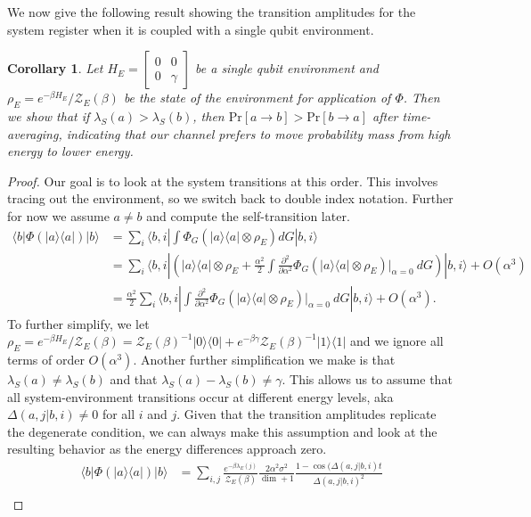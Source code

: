 \documentclass{article}
\newtheorem{corollary}[theorem]{Corollary}
\newcommand{\ket}[1]{|#1\rangle}
\newcommand{\bra}[1]{\langle #1|}
\newcommand{\ketbra}[2]{| #1\rangle\! \langle #2|}
\newcommand{\parens}[1]{\left( #1 \right)}
\newcommand{\prob}[1]{\text{Pr}\left[ #1 \right]}
\newcommand{\bigo}[1]{O\left( #1 \right)}
\newcommand{\partfun}{\mathcal{Z}}
\begin{document}
We now give the following result showing the transition amplitudes for the system register when it is coupled with a single qubit environment.
\begin{corollary}
    Let $H_E = \begin{bmatrix} 0 & 0 \\ 0 & \gamma \end{bmatrix}$ be a single qubit environment and $\rho_E = e^{-\beta H_E} / \partfun_E(\beta)$ be the state of the environment for application of $\Phi$. Then we show that if $\lambda_S(a) > \lambda_S(b)$, then $\prob{a \to b} > \prob{b \to a}$ after time-averaging, indicating that our channel prefers to move probability mass from high energy to lower energy. 
\end{corollary}
\begin{proof}
Our goal is to look at the system transitions at this order. This involves tracing out the environment, so we switch back to double index notation. Further for now we assume $a \neq b$ and compute the self-transition later.
\begin{align}
    \bra{b} \Phi(\ketbra{a}{a}) \ket{b} &= \sum_{i} \bra{b, i} \int \Phi_G(\ketbra{a}{a} \otimes \rho_E) dG \ket{b,i} \\
    &= \sum_i \bra{b,i} \parens{\ketbra{a}{a} \otimes \rho_E + \frac{\alpha^2}{2} \int \frac{\partial^2}{\partial \alpha^2} \Phi_G(\ketbra{a}{a} \otimes \rho_E) \bigg|_{\alpha =0} ~dG } \ket{b, i} + \bigo{\alpha^3} \\
    &= \frac{\alpha^2}{2} \sum_i \bra{b,i}  \int \frac{\partial^2}{\partial \alpha^2} \Phi_G(\ketbra{a}{a} \otimes \rho_E) \bigg|_{\alpha =0} ~dG  \ket{b, i} + \bigo{\alpha^3}.
\end{align}
To further simplify, we let $\rho_E = e^{-\beta H_E} / \partfun_E(\beta) = \partfun_E(\beta)^{-1} \ketbra{0}{0}  +  e^{-\beta \gamma} \partfun_E(\beta)^{-1} \ketbra{1}{1}$ and we ignore all terms of order $\bigo{\alpha^3}$. Another further simplification we make is that $\lambda_S(a) \neq \lambda_S(b)$ and that $\lambda_S(a) - \lambda_S(b) \neq \gamma$. This allows us to assume that all system-environment transitions occur at different energy levels, aka $\Delta(a,j | b, i) \neq 0$ for all $i$ and $j$. Given that the transition amplitudes replicate the degenerate condition, we can always make this assumption and look at the resulting behavior as the energy differences approach zero.
\begin{align}
    \bra{b} \Phi(\ketbra{a}{a}) \ket{b} &= \sum_{i, j} \frac{e^{-\beta \lambda_E(j)}}{\partfun_E(\beta)} \frac{2 \alpha^2 \sigma^2}{\dim + 1} \frac{1 - \cos(\Delta(a,j | b,i)t}{\Delta(a,j | b, i)^2} \\

\end{align}
\end{proof}
\end{document}
